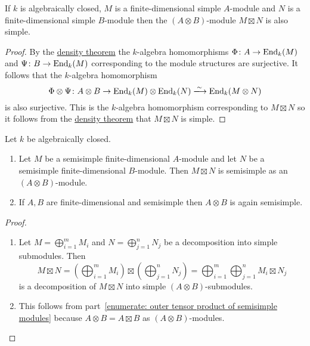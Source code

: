\begin{lemma}
  \label{lemma: tensor product of modules is again simple}
  If $k$ is algebraically closed, $M$ is a finite-dimensional simple $A$-module and $N$ is a finite-dimensional simple $B$-module then the $(A \otimes B)$-module $M \boxtimes N$ is also simple.
\end{lemma}


\begin{proof}
  By the \hyperref[theorem: density theorem]{density theorem} the $k$-algebra homomorphisms $\Phi \colon A \to \operatorname{End}_k(M)$ and $\Psi \colon B \to \operatorname{End}_k(M)$ corresponding to the module structures are surjective.
  It follows that the $k$-algebra homomorphism
  \[
                            \Phi \otimes \Psi
    \colon                  A \otimes B
    \to                     \End_k(M) \otimes \End_k(N)
    \xlongrightarrow{\sim}  \End_k(M \otimes N)
  \]
  is also surjective.
  This is the $k$-algebra homomorphism corresponding to $M \boxtimes N$ so it follows from the \hyperref[theorem: density theorem]{density theorem} that $M \boxtimes N$ is simple.
\end{proof}




\begin{corollary}
  Let $k$ be algebraically closed.
  \begin{enumerate}
    \item
      \label{enumerate: outer tensor product of semisimple modules}
      Let $M$ be a semisimple finite-dimensional $A$-module and let $N$ be a semisimple finite-dimensional $B$-module.
      Then $M \boxtimes N$ is semisimple as an $(A \otimes B)$-module.
    \item
      If $A, B$ are finite-dimensional and semisimple then $A \otimes B$ is again semisimple.
  \end{enumerate}
\end{corollary}


\begin{proof}
  \begin{enumerate}
    \item
      Let $M = \bigoplus_{i=1}^m M_i$ and $N = \bigoplus_{j=1}^n N_j$ be a decomposition into simple submodules.
      Then
      \[
          M \boxtimes N
        = \left( \bigoplus_{i=1}^m M_i \right) \boxtimes \left( \bigoplus_{j=1}^n N_j \right)
        = \bigoplus_{i=1}^m \bigoplus_{j=1}^n M_i \boxtimes N_j
      \]
      is a decomposition of $M \boxtimes N$ into simple $(A \otimes B)$-submodules.
    \item
      This follows from part~\ref*{enumerate: outer tensor product of semisimple modules} because $A \otimes B = A \boxtimes B$ as $(A \otimes B)$-modules.
    \qedhere
  \end{enumerate}
\end{proof}


